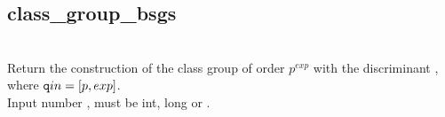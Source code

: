   \subsection{class\_group\_bsgs}
   \\
   \spacing
   \quad Return the construction of the class group of order $p^{exp}$ with the discriminant , where ${\texttt qin} = [p, exp]$. \\
   \spacing
   \quad Input number ,  must be int, long or . 
%
%
%
%
